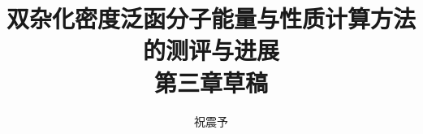 



\title{\textbf{双杂化密度泛函分子能量与性质计算方法的测评与进展\\第三章草稿}}
\author{祝震予}
\maketitle
\vspace{-10pt}

\tableofcontents


\setcounter{section}{2}



\newpage






